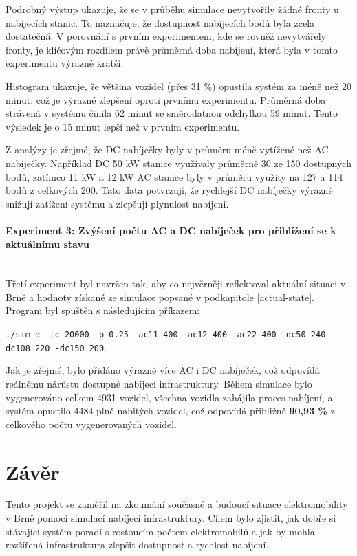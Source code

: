 \documentclass[a4paper,11pt]{article}
\begin{document}
Podrobný výstup ukazuje, že se v průběhu simulace nevytvořily žádné fronty u nabíjecích stanic. To naznačuje, že dostupnost nabíjecích bodů byla zcela dostatečná. V porovnání s prvním experimentem, kde se rovněž nevytvářely fronty, je klíčovým rozdílem právě průměrná doba nabíjení, která byla v tomto experimentu výrazně kratší.

Histogram ukazuje, že většina vozidel (přes 31 \%) opustila systém za méně než 20 minut, což je výrazné zlepšení oproti prvnímu experimentu. Průměrná doba strávená v systému činila 62 minut se směrodatnou odchylkou 59 minut. Tento výsledek je o 15 minut lepší než v prvním experimentu.

Z analýzy je zřejmé, že DC nabíječky byly v průměru méně vytížené než AC nabíječky. Například DC 50 kW stanice využívaly průměrně 30 ze 150 dostupných bodů, zatímco 11 kW a 12 kW AC stanice byly v průměru využity na 127 a 114 bodů z celkových 200. Tato data potvrzují, že rychlejší DC nabíječky výrazně snižují zatížení systému a zlepšují plynulost nabíjení.


\paragraph{Experiment 3: Zvýšení počtu AC a DC nabíječek pro přiblížení se k aktuálnímu stavu\\\\}
Třetí experiment byl navržen tak, aby co nejvěrněji reflektoval aktuální situaci v Brně a hodnoty získané ze simulace
popsané v podkapitole \ref{actual-state}. Program byl spuštěn s následujícím příkazem:

\texttt{./sim d -tc 20000 -p 0.25 -ac11 400 -ac12 400 -ac22 400 -dc50 240 -dc108 220 -dc150 200}.

Jak je zřejmé, bylo přidáno výrazně více AC i DC nabíječek, což odpovídá reálnému nárůstu dostupné nabíjecí
infrastruktury. Během simulace bylo vygenerováno celkem 4931 vozidel, všechna vozidla zahájila proces nabíjení,
a systém opustilo 4484 plně nabitých vozidel, což odpovídá přibližně \textbf{90,93 \%} z celkového počtu
vygenerovaných vozidel.





\section{Závěr}
Tento projekt se zaměřil na zkoumání současné a budoucí situace elektromobility v Brně pomocí simulací nabíjecí infrastruktury. Cílem bylo zjistit, jak dobře si stávající systém poradí s rostoucím počtem elektromobilů a jak by mohla rozšířená infrastruktura zlepšit dostupnost a rychlost nabíjení.
\end{document}
